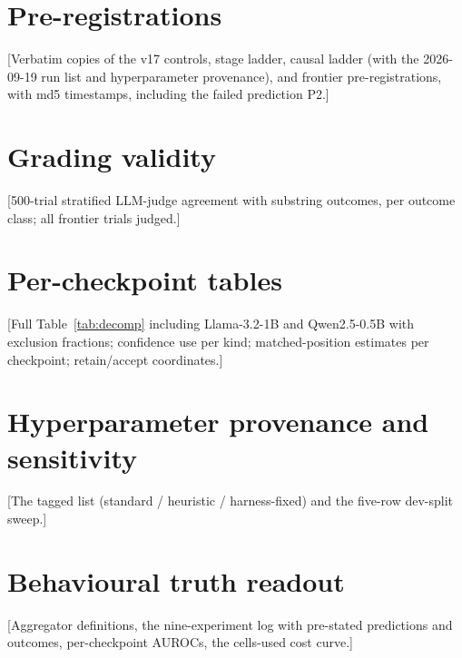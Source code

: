 \documentclass{article}
\newcommand{\pending}[1]{\textcolor{blue!70!black}{[#1]}}
\begin{document}



\appendix
\section{Pre-registrations}\label{app:prereg}
\pending{Verbatim copies of the v17 controls, stage ladder, causal ladder (with the 2026-09-19 run list and hyperparameter provenance), and frontier pre-registrations, with md5 timestamps, including the failed prediction P2.}
\section{Grading validity}\label{app:judge}
\pending{500-trial stratified LLM-judge agreement with substring outcomes, per outcome class; all frontier trials judged.}
\section{Per-checkpoint tables}\label{app:tables}
\pending{Full Table~\ref{tab:decomp} including Llama-3.2-1B and Qwen2.5-0.5B with exclusion fractions; confidence use per kind; matched-position estimates per checkpoint; retain/accept coordinates.}
\section{Hyperparameter provenance and sensitivity}\label{app:hparams}
\pending{The tagged list (standard / heuristic / harness-fixed) and the five-row dev-split sweep.}
\section{Behavioural truth readout}\label{app:readout}
\pending{Aggregator definitions, the nine-experiment log with pre-stated predictions and outcomes, per-checkpoint AUROCs, the cells-used cost curve.}
\end{document}
